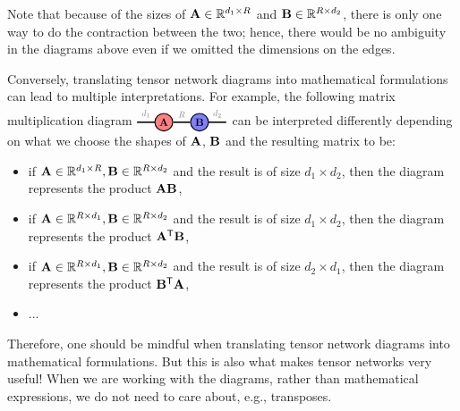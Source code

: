 Note that because of the sizes of $\mathbf{A}\in\mathbb{R}^{d_1\times R}$ and $\mathbf{B}\in\mathbb{R}^{R\times d_2}$, there is only one way to do the contraction between the two; hence, there would be no ambiguity in the diagrams above even if we omitted the dimensions on the edges. 

Conversely, translating tensor network diagrams into mathematical formulations can lead to multiple interpretations. For example, the following matrix multiplication diagram
$
\begin{tikzpicture}[baseline=\baseline]
   \tikzset{tensor/.style = {minimum size = 0.5cm,shape = circle,thick,draw=black,inner sep = 0pt}, edge/.style = {thick,line width=.4mm},every loop/.style={}}
    \def\y{0}
    \def\x{0}
    \node[tensor,fill=red!50!white] (A) at (\x,\y){\scalebox{0.85}{$\Ab$}};
    \node[tensor,fill=blue!50!white] (B) at (\x+1,\y){\scalebox{0.85}{$\Bb$}};
    \draw[edge] (A) -- (B) node [midway,above] {\scalebox{0.7}{\dimcolor{$R$}}};
    \draw[edge] (\x-0.25,\y) -- (\x-0.75,\y) node [midway,above] {\scalebox{0.7}{\dimcolor{$d_1$}}};
    \draw[edge] (\x+1.25,\y) -- (\x+1.75,\y) node [midway,above] {\scalebox{0.7}{\dimcolor{$d_2$}}};
\end{tikzpicture}
$
can be interpreted differently depending on what we choose the shapes of $\mathbf{A}$, $\mathbf{B}$ and the resulting matrix to be:
\begin{itemize}
    \item if $\mathbf{A}\in\mathbb{R}^{d_1\times R}, \mathbf{B}\in\mathbb{R}^{R\times d_2}$ and the result is of size $d_1 \times d_2$, then the diagram represents the product $\mathbf{A}\mathbf{B}$,
    \item if $\mathbf{A}\in\mathbb{R}^{R\times d_1}, \mathbf{B}\in\mathbb{R}^{R\times d_2}$ and the result is of size $d_1 \times d_2$, then the diagram represents the product $\mathbf{A}^{\mathsf{T}}\mathbf{B}$,
    \item if $\mathbf{A}\in\mathbb{R}^{R\times d_1}, \mathbf{B}\in\mathbb{R}^{R\times d_2}$ and the result is of size $d_2 \times d_1$, then the diagram represents the product $\mathbf{B}^{\mathsf{T}}\mathbf{A}$,
    \item ...
\end{itemize}
Therefore, one should be mindful when translating tensor network diagrams into mathematical formulations. But this is also what makes tensor networks very useful! When we are working with the diagrams, rather than mathematical expressions, we do not need to care about, e.g., transposes.


